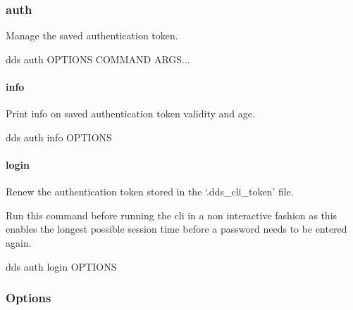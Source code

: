 \documentclass[letterpaper,10pt,english]{sphinxmanual}
\begin{document}
\subsubsection{auth}
\label{\detokenize{usage:dds-auth}}
\sphinxAtStartPar
Manage the saved authentication token.

\begin{sphinxVerbatim}[commandchars=\\\{\}]
dds auth \PYG{o}{[}OPTIONS\PYG{o}{]} COMMAND \PYG{o}{[}ARGS\PYG{o}{]}...
\end{sphinxVerbatim}


\paragraph{info}
\label{\detokenize{usage:dds-auth-info}}
\sphinxAtStartPar
Print info on saved authentication token validity and age.

\begin{sphinxVerbatim}[commandchars=\\\{\}]
dds auth info \PYG{o}{[}OPTIONS\PYG{o}{]}
\end{sphinxVerbatim}


\paragraph{login}
\label{\detokenize{usage:dds-auth-login}}
\sphinxAtStartPar
Renew the authentication token stored in the ‘.dds\_cli\_token’ file.

\sphinxAtStartPar
Run this command before running the cli in a non interactive fashion as this enables the longest
possible session time before a password needs to be entered again.

\begin{sphinxVerbatim}[commandchars=\\\{\}]
dds auth login \PYG{o}{[}OPTIONS\PYG{o}{]}
\end{sphinxVerbatim}
\subsubsection*{Options}
\end{document}

